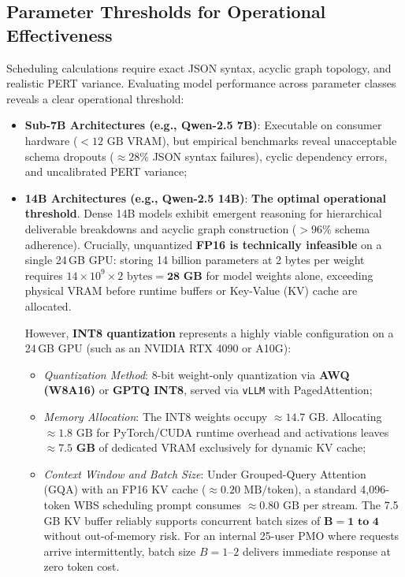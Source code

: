 \subsection{Parameter Thresholds for Operational Effectiveness}
Scheduling calculations require exact JSON syntax, acyclic graph topology, and realistic PERT variance. Evaluating model performance across parameter classes reveals a clear operational threshold:
\begin{itemize}[itemsep=1.5pt,topsep=1.5pt]
    \item \textbf{Sub-7B Architectures (e.g., Qwen-2.5 7B)}: Executable on consumer hardware ($<12\text{ GB}$ VRAM), but empirical benchmarks reveal unacceptable schema dropouts ($\approx 28\%$ JSON syntax failures), cyclic dependency errors, and uncalibrated PERT variance;
    
    \vspace{1mm}
    
    \item \textbf{14B Architectures (e.g., Qwen-2.5 14B)}: \textbf{The optimal operational threshold}. Dense 14B models exhibit emergent reasoning for hierarchical deliverable breakdowns and acyclic graph construction ($>96\%$ schema adherence). Crucially, unquantized \textbf{FP16 is technically infeasible} on a single 24\,GB GPU: storing 14 billion parameters at 2 bytes per weight requires $14 \times 10^9 \times 2\text{ bytes} = \mathbf{28\text{ GB}}$ for model weights alone, exceeding physical VRAM before runtime buffers or Key-Value (KV) cache are allocated.
    
    However, \textbf{INT8 quantization} represents a highly viable configuration on a 24\,GB GPU (such as an NVIDIA RTX 4090 or A10G):
    \begin{itemize}[itemsep=1pt,topsep=1pt]
        \item \textit{Quantization Method}: 8-bit weight-only quantization via \textbf{AWQ (W8A16)} or \textbf{GPTQ INT8}, served via \texttt{vLLM} with PagedAttention;
        \item \textit{Memory Allocation}: The INT8 weights occupy $\approx 14.7\text{ GB}$. Allocating $\approx 1.8\text{ GB}$ for PyTorch/CUDA runtime overhead and activations leaves $\mathbf{\approx 7.5\text{ GB}}$ of dedicated VRAM exclusively for dynamic KV cache;
        \item \textit{Context Window and Batch Size}: Under Grouped-Query Attention (GQA) with an FP16 KV cache ($\approx 0.20\text{ MB/token}$), a standard 4,096-token WBS scheduling prompt consumes $\approx 0.80\text{ GB}$ per stream. The 7.5\,GB KV buffer reliably supports concurrent batch sizes of $\mathbf{B = 1\text{ to }4}$ without out-of-memory risk. For an internal 25-user PMO where requests arrive intermittently, batch size $B=1\text{--}2$ delivers immediate response at zero token cost.
    \end{itemize}
    

\end{itemize}
